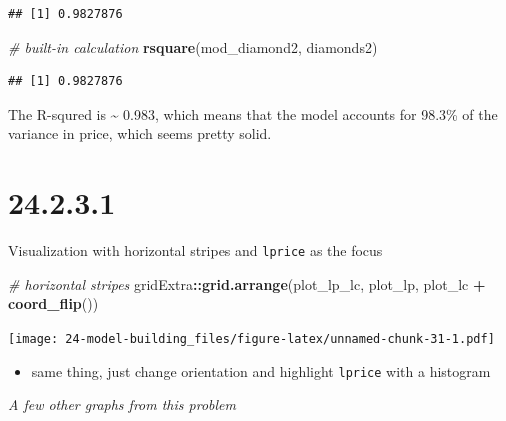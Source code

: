 \documentclass[]{book}
\newenvironment{Shaded}{\begin{snugshade}}{\end{snugshade}}
\newcommand{\CommentTok}[1]{\textcolor[rgb]{0.56,0.35,0.01}{\textit{#1}}}
\newcommand{\DataTypeTok}[1]{\textcolor[rgb]{0.13,0.29,0.53}{#1}}
\newcommand{\DecValTok}[1]{\textcolor[rgb]{0.00,0.00,0.81}{#1}}
\newcommand{\KeywordTok}[1]{\textcolor[rgb]{0.13,0.29,0.53}{\textbf{#1}}}
\newcommand{\NormalTok}[1]{#1}
\newcommand{\OperatorTok}[1]{\textcolor[rgb]{0.81,0.36,0.00}{\textbf{#1}}}
\newcommand{\StringTok}[1]{\textcolor[rgb]{0.31,0.60,0.02}{#1}}
\providecommand{\tightlist}{%
  \setlength{\itemsep}{0pt}\setlength{\parskip}{0pt}}
\theoremstyle{definition}
\theoremstyle{definition}
\theoremstyle{definition}
\theoremstyle{remark}
\begin{document}
\begin{verbatim}
## [1] 0.9827876
\end{verbatim}

\begin{Shaded}
\begin{Highlighting}[]
\CommentTok{# built-in calculation}
\KeywordTok{rsquare}\NormalTok{(mod_diamond2, diamonds2)}
\end{Highlighting}
\end{Shaded}

\begin{verbatim}
## [1] 0.9827876
\end{verbatim}

The R-squred is \textasciitilde{} 0.983, which means that the model
accounts for 98.3\% of the variance in price, which seems pretty solid.

\hypertarget{section-86}{%
\section{24.2.3.1}\label{section-86}}

Visualization with horizontal stripes and \texttt{lprice} as the focus

\begin{Shaded}
\begin{Highlighting}[]
\CommentTok{# horizontal stripes}
\NormalTok{gridExtra}\OperatorTok{::}\KeywordTok{grid.arrange}\NormalTok{(plot_lp_lc, plot_lp, plot_lc }\OperatorTok{+}\StringTok{ }\KeywordTok{coord_flip}\NormalTok{()) }
\end{Highlighting}
\end{Shaded}

\texttt{[image: 24-model-building\_files/figure-latex/unnamed-chunk-31-1.pdf]}

\begin{itemize}
\tightlist
\item
  same thing, just change orientation and highlight \texttt{lprice} with
  a histogram
\end{itemize}

\emph{A few other graphs from this problem}

\begin{Shaded}
\end{Shaded}
\end{document}
